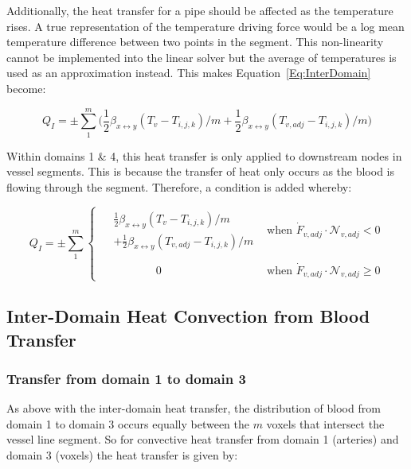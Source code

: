 \documentclass[11pt,english,a4paper,twoside,openright]{report}
\begin{document}
{{{{{{{{Additionally, the heat transfer for a pipe should be affected as the temperature rises. A true representation of the temperature driving force would be a log mean temperature difference between two points in the segment. This non-linearity cannot be implemented into the linear solver but the average of temperatures is used as an approximation instead. This makes Equation~\ref{Eq:InterDomain} become:

\begin{equation}
\label{Eq:InterDomain2}
Q_{I}=\pm\sum_{1}^{m}\bigg(\frac{1}{2}\beta_{x\leftrightarrow y}(T_{v}-T_{i,j,k})/m+\frac{1}{2}\beta_{x\leftrightarrow y}(T_{v,adj}-T_{i,j,k})/m\bigg)
\end{equation}

Within domains 1 \& 4, this heat transfer is only applied to downstream nodes in vessel segments. This is because the transfer of heat only occurs as the blood is flowing through the segment. Therefore, a condition is added whereby:

\begin{equation}
Q_{I}=\pm\sum_{1}^{m}
\begin{cases}
\!\begin{aligned}%
& \frac{1}{2}\beta_{x\leftrightarrow y}(T_{v}-T_{i,j,k})/m \\
& +\frac{1}{2}\beta_{x\leftrightarrow y}(T_{v,adj}-T_{i,j,k})/m
\end{aligned}           & \text{when $\dot{F}_{v,adj}\cdot \mathcal{N}_{v,adj} < 0$} \\
\\
\qquad \qquad \quad 0 & \text{when $\dot{F}_{v,adj}\cdot \mathcal{N}_{v,adj} \geq 0$}
\end{cases}
\end{equation}

\subsection{Inter-Domain Heat Convection from Blood Transfer}

\subsubsection{Transfer from domain 1 to domain 3}

As above with the inter-domain heat transfer, the distribution of blood from domain 1 to domain 3 occurs equally between the $m$ voxels that intersect the vessel line segment. So for convective heat transfer from domain 1 (arteries) and domain 3 (voxels) the heat transfer is given by:

}}}}}}}}
\end{document}

